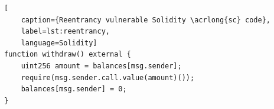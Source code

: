 \begin{lstlisting}[
    caption={Reentrancy vulnerable Solidity \acrlong{sc} code},
    label=lst:reentrancy,
    language=Solidity]
function withdraw() external {
    uint256 amount = balances[msg.sender];
    require(msg.sender.call.value(amount)());
    balances[msg.sender] = 0;
}   
\end{lstlisting}







